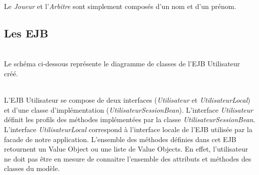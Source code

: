 \documentclass[10pt]{report}
\begin{document}
Le \textit{Joueur} et l'\textit{Arbitre} sont simplement composés d'un nom et d'un prénom.

\newpage
\subsection{Les EJB}
~\\
Le schéma ci-dessous représente le diagramme de classes de l'EJB Utilisateur créé. \\
	\begin{figure}[hp]
	      \begin{center}
	      \end{center}
	\end{figure}
\\

L'EJB Utilisateur se compose de deux interfaces (\textit{Utilisateur} et \textit{UtilisateurLocal}) et d'une classe d'implémentation (\textit{UtilisateurSessionBean}). L'interface \textit{Utilisateur} définit les profils des méthodes implémentées par la classe \textit{UtilisateurSessionBean}. L'interface \textit{UtilisateurLocal} correspond à l'interface locale de l'EJB utilisée par la facade de notre application. L'ensemble des méthodes définies dans cet EJB retournent un Value Object ou une liste de Value Objects. En effet, l'utilisateur ne doit pas être en mesure de connaitre l'ensemble des attributs et méthodes des classes du modèle.
\end{document}
